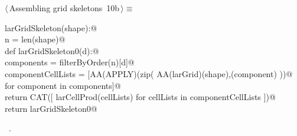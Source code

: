 \documentclass[11pt,oneside]{article}	%
\begin{document}
\begin{flushleft} \small \label{scrap15}
\protect{}$\langle\,$Assembling grid skeletons\nobreak\ {\footnotesize 10b}$\,\rangle\equiv$
\vspace{-1ex}
\begin{list}{}{} \item
\mbox{}\verb@def larGridSkeleton(shape):@\\
\mbox{}\verb@    n = len(shape)@\\
\mbox{}\verb@    def larGridSkeleton0(d):@\\
\mbox{}\verb@        components = filterByOrder(n)[d]@\\
\mbox{}\verb@        componentCellLists = [AA(APPLY)(zip( AA(larGrid)(shape),(component) ))@\\
\mbox{}\verb@                              for component in components]@\\
\mbox{}\verb@        return CAT([ larCellProd(cellLists)  for cellLists in componentCellLists ])@\\
\mbox{}\verb@    return larGridSkeleton0@\\
\mbox{}\verb@@{\NWsep}
\end{list}
\vspace{-1ex}
\footnotesize\addtolength{\baselineskip}{-1ex}
\begin{list}{}{\setlength{\itemsep}{-\parsep}\setlength{\itemindent}{-\leftmargin}}
\item \NWtxtMacroRefIn\ .
\end{list}
\end{flushleft}
\end{document}
